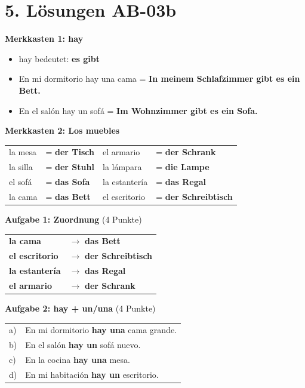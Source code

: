 \documentclass[11pt, a4paper]{article}
\newcommand{\fachfarbe}{spanisch}
\newcommand{\sequenz}{03}
\newcommand{\block}{b}
\newcommand{\loesung}[1]{\textcolor{loesung}{\textbf{#1}}}
\newcommand{\es}[1]{\textcolor{\fachfarbe}{\textbf{#1}}}
\begin{document}

\section*{5. Lösungen AB-\sequenz\block}

\textbf{Merkkasten 1: hay}
\begin{itemize}
    \item hay bedeutet: \loesung{es gibt}
    \item En mi dormitorio hay una cama = \loesung{In meinem Schlafzimmer gibt es ein Bett.}
    \item En el salón hay un sofá = \loesung{Im Wohnzimmer gibt es ein Sofa.}
\end{itemize}

\textbf{Merkkasten 2: Los muebles}

\begin{tabular}{ll|ll}
la mesa & = \loesung{der Tisch} & el armario & = \loesung{der Schrank} \\
la silla & = \loesung{der Stuhl} & la lámpara & = \loesung{die Lampe} \\
el sofá & = \loesung{das Sofa} & la estantería & = \loesung{das Regal} \\
la cama & = \loesung{das Bett} & el escritorio & = \loesung{der Schreibtisch} \\
\end{tabular}

\vspace{1em}

\textbf{Aufgabe 1: Zuordnung} (4 Punkte)

\begin{tabular}{ll}
\es{la cama} & $\rightarrow$ \loesung{das Bett} \\
\es{el escritorio} & $\rightarrow$ \loesung{der Schreibtisch} \\
\es{la estantería} & $\rightarrow$ \loesung{das Regal} \\
\es{el armario} & $\rightarrow$ \loesung{der Schrank} \\
\end{tabular}

\vspace{1em}

\textbf{Aufgabe 2: hay + un/una} (4 Punkte)

\begin{tabular}{ll}
a) & En mi dormitorio \loesung{hay una} cama grande. \\
b) & En el salón \loesung{hay un} sofá nuevo. \\
c) & En la cocina \loesung{hay una} mesa. \\
d) & En mi habitación \loesung{hay un} escritorio. \\
\end{tabular}
\end{document}
